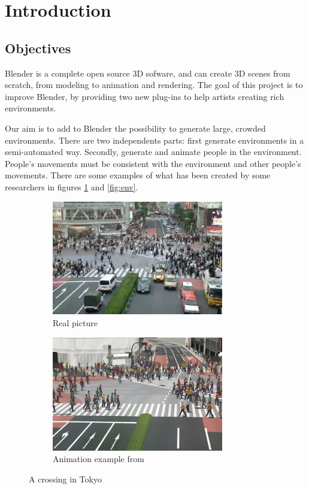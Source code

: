 \section{Introduction}

\subsection{Objectives}

Blender is a complete open source 3D sofware, and can create 3D scenes from
scratch, from modeling to animation and rendering. The goal of this
project is to improve Blender, by
providing two new plug-ins to help artists creating rich environments.

Our aim is to add to Blender the possibility to generate large,
crowded environments. There are two independents parts: first
generate environments in a semi-automated way. Secondly, generate and
animate people in the environment. People's movements must be consistent
with the environment and other people's movements. There are some
examples of what has been created by some researchers in figures
\ref{fig:crowd} and \ref{fig:env}.

\begin{figure}[h] \centering

  \begin{subfigure}[t]{0.5\textwidth}
    \includegraphics[width=7.5cm]{img/PLE_real.png}
    \caption{Real picture}
  \end{subfigure}%
  \begin{subfigure}[t]{0.5\textwidth}
    \includegraphics[width=7.5cm]{img/PLE_simu.png}
    \caption{Animation example from \cite{PLE}}
  \end{subfigure}
  \caption{A crossing in Tokyo}
  \label{fig:crowd}
\end{figure}

